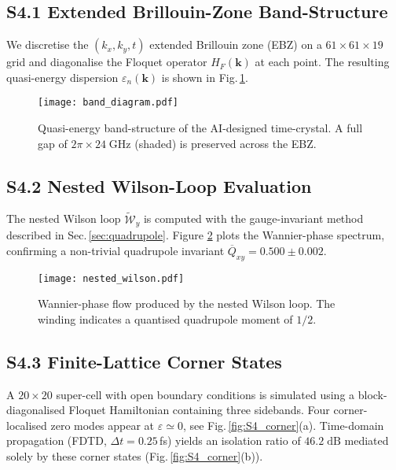 \documentclass[11pt]{article}
\begin{document}
\subsection*{S4.1  Extended Brillouin-Zone Band-Structure}

We discretise the $(k_x,k_y,t)$ extended Brillouin zone (EBZ) on a
$61\times61\times19$ grid and diagonalise the Floquet operator
$H_F(\mathbf{k})$ at each point.  The resulting quasi-energy dispersion
$\varepsilon_n(\mathbf{k})$ is shown in Fig.\,\ref{fig:S4_band}.

\begin{figure}[h]
  \centering
  \texttt{[image: band\_diagram.pdf]}
  \caption{Quasi-energy band-structure of the AI-designed
  time-crystal.  A full gap of \(2\pi\times 24\;\mathrm{GHz}\) (shaded) is
  preserved across the EBZ.}
  \label{fig:S4_band}
\end{figure}

\subsection*{S4.2  Nested Wilson-Loop Evaluation}

The nested Wilson loop
\(\widetilde{\mathcal{W}}_y\) is computed with the gauge-invariant
method described in Sec.\,\ref{sec:quadrupole}.  Figure
\ref{fig:S4_Wloop} plots the Wannier-phase spectrum, confirming a
non-trivial quadrupole invariant
\(\overline{Q}_{xy}=0.500\pm0.002\).

\begin{figure}[h]
  \centering
  \texttt{[image: nested\_wilson.pdf]}
  \caption{Wannier-phase flow produced by the nested Wilson loop.  The
  winding indicates a quantised quadrupole moment of \(1/2\).}
  \label{fig:S4_Wloop}
\end{figure}

\subsection*{S4.3  Finite-Lattice Corner States}

A $20\times20$ super-cell with open boundary conditions is simulated
using a block-diagonalised Floquet Hamiltonian containing three
sidebands.  Four corner-localised zero modes appear at
\(\varepsilon\simeq0\), see Fig.\,\ref{fig:S4_corner}(a).  Time-domain
propagation (FDTD, $\Delta t=0.25$\,fs) yields an isolation ratio of
\(46.2\;\mathrm{dB}\) mediated solely by these corner states
(Fig.\,\ref{fig:S4_corner}(b)).
\end{document}
